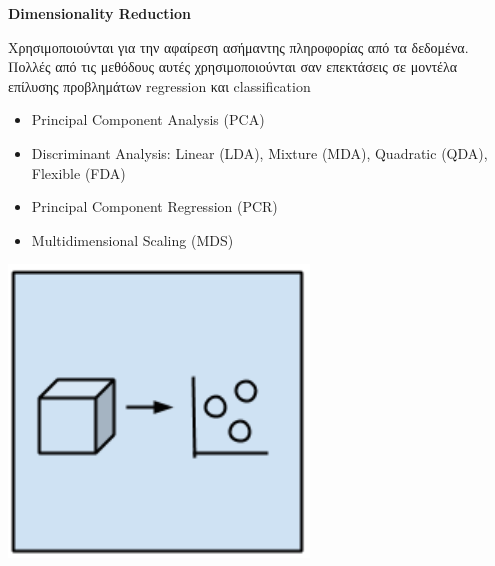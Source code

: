 \begin{minipage}{0.5\textwidth}

  \textbf{\large Dimensionality Reduction}

  Χρησιμοποιούνται για την αφαίρεση ασήμαντης πληροφορίας
  από τα δεδομένα. Πολλές από τις μεθόδους αυτές χρησιμοποιούνται σαν επεκτάσεις σε μοντέλα επίλυσης
  προβλημάτων regression και classification

  \begin{itemize}
    \setlength\itemsep{0em}
    \item{Principal Component Analysis (PCA)}
    \item{Discriminant Analysis: Linear (LDA), Mixture (MDA), Quadratic (QDA), Flexible (FDA)}
    \item{Principal Component Regression (PCR)}
    \item{Multidimensional Scaling (MDS)}
  \end{itemize}
\end{minipage}
\begin{minipage}{0.5\textwidth}
  \begin{center}
    \includegraphics[width=0.6\textwidth]{./images/chapter3/dimensional_reduction_algorithms.png}
  \end{center}
\end{minipage}

